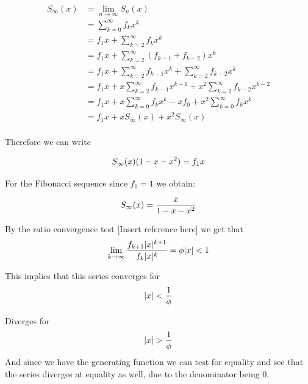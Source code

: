 \documentclass[a4paper]{article}
\begin{document}
\begin{equation}
\begin{split}
S_{\infty}(x) & = \lim_{n \to \infty} S_n(x) \\
 & = \sum_{k=0}^{\infty} f_k x^k \\
 & = f_1 x + \sum_{k=2}^{\infty} f_k x^k \\
 & = f_1 x + \sum_{k=2}^{\infty} (f_{k-1} + f_{k-2}) x^k \\
 & = f_1 x + \sum_{k=2}^{\infty} f_{k-1} x^k + \sum_{k=2}^{\infty} f_{k-2} x^k \\
  & = f_1 x + x \sum_{k=2}^{\infty} f_{k-1} x^{k-1} + x^2 \sum_{k=2}^{\infty} f_{k-2} x^{k-2} \\
  & = f_1 x + x \sum_{k=0}^{\infty} f_{k} x^{k} - x f_0 + x^2 \sum_{k=0}^{\infty} f_{k} x^{k} \\
  & = f_1 x + x S_{\infty}(x) + x^2 S_{\infty}(x) \\
\end{split}\label{fib:eq:equation15}
\end{equation}

Therefore we can write

\begin{equation}
S_{\infty}(x) (1 - x -x^2 ) = f_1 x \\
\label{fib:eq:equation16}
\end{equation}

For the Fibonacci sequence since $f_1 = 1$ we obtain:

\begin{equation}
S_{\infty}(x) = \frac{x}{1 - x -x^2 }  \\
\label{fib:eq:equation17}
\end{equation}

By the ratio convergence test [Insert reference here]
we get that
\begin{equation}
\lim_{k \to
\infty} \frac{f_{k+1} |x|^{k+1}}{f_{k} |x|^{k}} = \phi |x| < 1 \\
\label{fib:eq:equation18}
\end{equation}

This implies that this series converges for
\begin{equation}
|x| < \frac{1}{\phi} \\
\label{fib:eq:equation19}
\end{equation}

Diverges for
\begin{equation}
|x| > \frac{1}{\phi} \\
\label{fib:eq:equation20}
\end{equation}
And since we have the generating function we can test for equality and see that the series diverges at equality as well, due to the denominator being 0.
\end{document}

